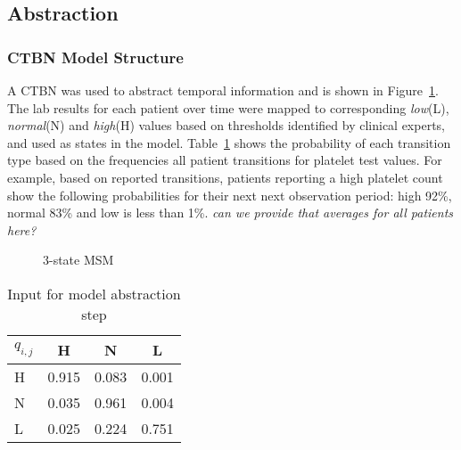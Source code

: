 

\subsection{Abstraction}
\subsubsection{CTBN Model Structure}
A CTBN was used to abstract temporal information and is shown in Figure~\ref{msmgraph}.  The lab results for each patient over time were mapped to corresponding \emph{low}(L), \emph{normal}(N) and \emph{high}(H) values based on thresholds identified by clinical experts, and used as states in the model.  Table~\ref{hepxtab} shows the probability of each transition type based on the frequencies all patient transitions for platelet test values.  For example, based on reported transitions, patients reporting a high platelet count show the following probabilities for their next next observation period: high 92\%, normal 83\% and low is less than 1\%.
\emph{can we provide that averages for all patients here?}

\begin{figure}
\begin{center}
\end{center}
\caption{3-state MSM}
\label{msmgraph}
\end{figure}

\begin{table}[ht]
\caption{Input for model abstraction step}
\label{hepxtab}
\vskip 0.15in
\begin{center}
\begin{tabular}{ l | c | c |c}
 $q_{i,j}$      & H & N & L  \\
\hline
H  & 0.915 & 0.083 & 0.001  \\\hline
N  & 0.035 &0.961 &0.004 \\\hline
L   & 0.025 &0.224 &0.751  \\
\end{tabular}
\end{center}
\vskip -0.1in
\end{table}

